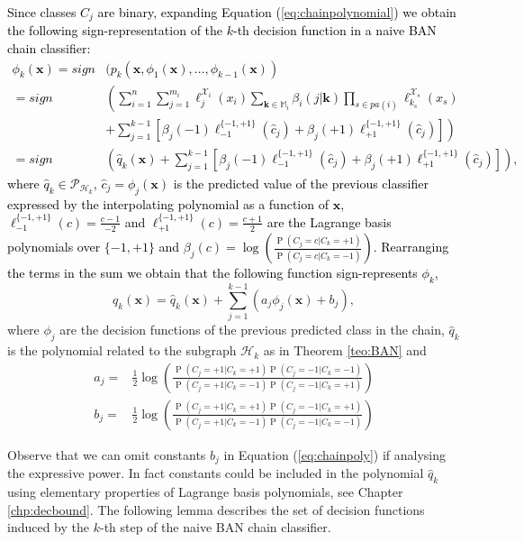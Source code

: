 \documentclass[11pt,a4paper, twoside]{book}
\newcommand{\Pp}{\operatorname{P}}
\newcommand{\nchi}{\mathcal{X}}
\begin{document}
\textcolor{black}{Since classes $C_j$ are binary, expanding Equation (\ref{eq:chainpolynomial}) we obtain the following sign-representation of the $k$-th decision function in a naive BAN chain classifier:
\begin{align*}
\phi_k(\mathbf{x})=sign&( p_k(\mathbf{x},\phi_{1}(\mathbf{x}),\ldots,\phi_{{k-1}}(\mathbf{x}))\\
=sign & \left(\sum_{i=1}^{n}  \sum_{j=1}^{m_i}\ell_{j}^{{ \nchi}_i}(x_i) \sum_{\mathbf{k}\in \mathbb{M}_i} \beta_{i}(j|\mathbf{k})\prod_{s\in  {pa}(i)} \ell_{k_s}^{{ \nchi}_{s}}(x_{s})\right.  \\
 &+  \left. \sum_{j=1}^{k-1}\left[ \beta_j(-1)\ell_{-1}^{\{-1,+1\}}(\hat{c}_j)+\beta_j(+1)\ell_{+1}^{\{-1,+1\}}(\hat{c}_j)\right]\right)\\
=sign&\left(\hat{q}_k(\mathbf{x})+\sum_{j=1}^{k-1} \left[ \beta_j(-1)\ell_{-1}^{\{-1,+1\}}(\hat{c}_j)+\beta_j(+1)\ell_{+1}^{\{-1,+1\}}(\hat{c}_j)\right] \right),
\end{align*}
where $\hat{q}_k\in \mathcal{P}_{\mathcal{H}_k}$, $\hat{c}_j=\phi_{j}(\mathbf{x})$ is the predicted value of the previous classifier expressed by the interpolating polynomial as a function of $\mathbf{x}$, $\ell_{-1}^{\{-1,+1\}}(c)=\frac{c-1}{-2}$ and $\ell_{+1}^{\{-1,+1\}}(c)=\frac{c+1}{2}$ are the Lagrange basis polynomials over $\{-1,+1\}$ and $\beta_j(c)=\log\left(\frac{\Pp(C_j=c|C_k=+1)}{\Pp(C_j=c|C_k=-1)}\right)$.
Rearranging the terms in the sum we obtain that the following function sign-represents $\phi_k$,}
\begin{equation}
q_k(\mathbf{x})=\hat{q}_k(\mathbf{x})+\sum_{j=1}^{k-1}\left( a_j \phi_{j}(\mathbf{x})+b_j\right),
 \label{eq:chainpoly} 
\end{equation}
where $\phi_j$ are the decision functions of the previous predicted class in the chain, $\hat{q}_k$ is the polynomial related to the subgraph $\mathcal{H}_k$ as in Theorem \ref{teo:BAN} and
\begin{align} a_j=& \frac{1}{2}\log\left( \frac{ \Pp(C_j=+1|C_k=+1)\Pp(C_j=-1|C_k=-1)}{\Pp(C_j=+1|C_k=-1)\Pp(C_j=-1|C_k=+1)}\right)\label{eq:coeff1} \\
 b_j=& \frac{1}{2}\log\left( \frac{ \Pp(C_j=+1|C_k=+1)\Pp(C_j=-1|C_k=+1)}{\Pp(C_j=+1|C_k=-1)\Pp(C_j=-1|C_k=-1)}\right)\label{eq:coeff2}  
 \end{align}


Observe that we can omit constants $b_j$ in Equation (\ref{eq:chainpoly}) if analysing the expressive power. In fact constants could be included in the polynomial $\hat{q}_k$ using elementary properties of Lagrange basis polynomials, see Chapter \ref{chp:decbound}. 
The following lemma describes the set of decision functions induced by the $k$-th step of the naive BAN chain classifier.
\end{document}
